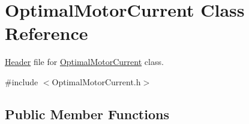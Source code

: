 \hypertarget{class_optimal_motor_current}{}\section{Optimal\+Motor\+Current Class Reference}
\label{class_optimal_motor_current}


\hyperlink{class_header}{Header} file for \hyperlink{class_optimal_motor_current}{Optimal\+Motor\+Current} class.  




{\ttfamily \#include $<$Optimal\+Motor\+Current.\+h$>$}

\subsection*{Public Member Functions}

